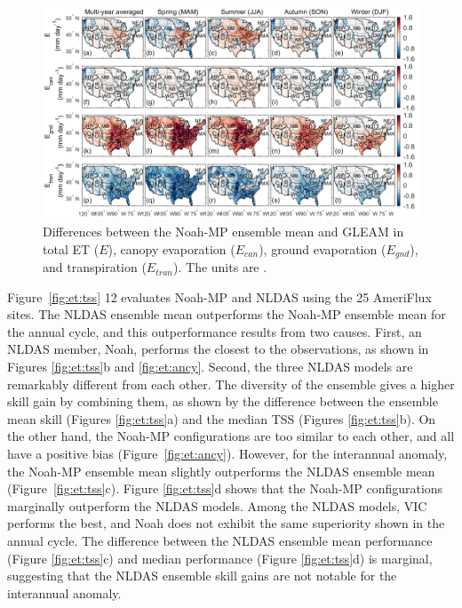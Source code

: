 \documentclass[essd, manuscript]{copernicus}
\let\unit\undefined
\begin{document}
\begin{figure}[t]
  \includegraphics[width=12cm]{fig/fig11.pdf}
  \caption{Differences between the Noah-MP ensemble mean and GLEAM in total ET (\(E\)), canopy evaporation (\(E_{can}\)), ground evaporation (\(E_{gnd}\)), and transpiration (\(E_{tran}\)). The units are \unit{mm.day^{-1}}.}
  \label{fig:et:decomp}
\end{figure}

Figure~\ref{fig:et:tss} 12 evaluates Noah-MP and NLDAS using the 25 AmeriFlux sites. The NLDAS ensemble mean outperforms the Noah-MP ensemble mean for the annual cycle, and this outperformance results from two causes. First, an NLDAS member, Noah, performs the closest to the observations, as shown in Figures \ref{fig:et:tss}b and \ref{fig:et:ancy}. Second, the three NLDAS models are remarkably different from each other. The diversity of the ensemble gives a higher skill gain by combining them, as shown by the difference between the ensemble mean skill (Figures \ref{fig:et:tss}a) and the median TSS (Figures \ref{fig:et:tss}b). On the other hand, the Noah-MP configurations are too similar to each other, and all have a positive bias (Figure~\ref{fig:et:ancy}). However, for the interannual anomaly, the Noah-MP ensemble mean slightly outperforms the NLDAS ensemble mean (Figure~\ref{fig:et:tss}c). Figure \ref{fig:et:tss}d shows that the Noah-MP configurations marginally outperform the NLDAS models. Among the NLDAS models, VIC performs the best, and Noah does not exhibit the same superiority shown in the annual cycle. The difference between the NLDAS ensemble mean performance (Figure \ref{fig:et:tss}c) and median performance (Figure \ref{fig:et:tss}d) is marginal, suggesting that the NLDAS ensemble skill gains are not notable for the interannual anomaly.
\end{document}
